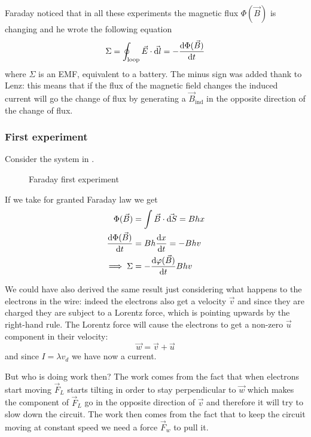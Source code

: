 \documentclass[12pt]{extarticle}
\begin{document}
Faraday noticed that in all these experiments the magnetic flux $\Phi(\vec B)$ is changing
and he wrote the following equation
\begin{equation}
    \Sigma = \oint_\text{loop} \vec E \cdot \vec{\dd l} = - \dv{\Phi(\vec B)}{t}
\end{equation}
where $\Sigma$ is an EMF, equivalent to a battery.
The minus sign was added thank to Lenz: this means that if the flux of the magnetic field changes
the induced current will go  the change of flux
by generating a $\vec B_\text{ind}$ in the opposite direction of the change of flux.

\subsubsection{First experiment}
Consider the system in .

\begin{figure}[H]
    \centering
    
    \caption{Faraday first experiment}
    \label{fig:faraday-exp-1}
\end{figure}

If we take for granted Faraday law we get
\begin{align}
    \Phi(\vec B)         & = \int \vec B \cdot \vec{\dd S} = B h x \\
    \dv{\Phi(\vec B)}{t} & = B h \dv{x}{t} = - B h v               \\
    \implies \Sigma      & = - \dv{\varphi(\vec B)}{t} B h v
\end{align}

We could have also derived the same result just considering what happens to the electrons in the wire:
indeed the electrons also get a velocity $\vec v$ and since they are charged they are subject to a Lorentz
force, which is pointing upwards by the right-hand rule.
The Lorentz force will cause the electrons to get a non-zero $\vec u$ component in their velocity:
\begin{equation}
    \vec w = \vec v + \vec u
\end{equation}
and since $I = \lambda v_d$ we have now a current.

But who is doing work then?
The work comes from the fact that when electrons start moving $\vec F_L$ starts tilting in order to stay
perpendicular to $\vec w$ which makes the component of $\vec F_L$ go in the opposite direction of $\vec v$
and therefore it will try to slow down the circuit.
The work then comes from the fact that to keep the circuit moving at constant speed
we need a force $\vec F_w$ to pull it.
\end{document}
